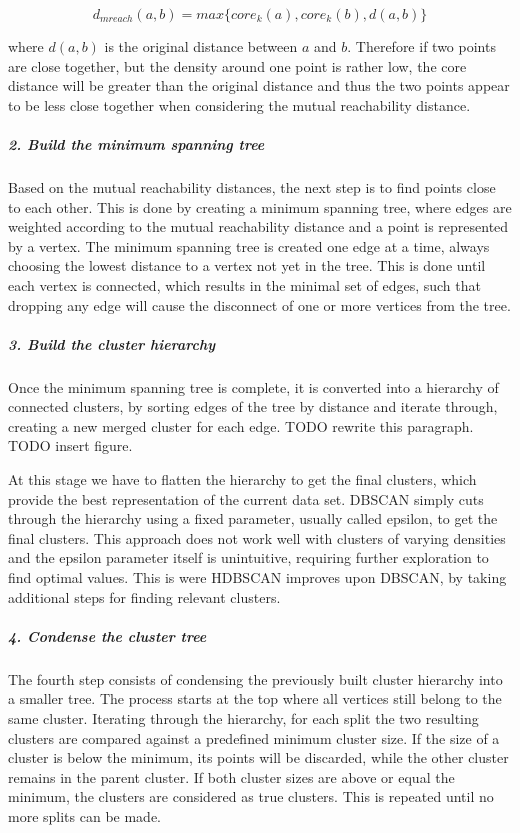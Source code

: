 \begin{equation*}
    d_{mreach}(a, b) = max\{core_k(a), core_k(b), d(a, b)\}
\end{equation*}

where $d(a, b)$ is the original distance between $a$ and $b$. Therefore if two points are close together, but the density around one point is rather low, the core distance will be greater than the original distance and thus the two points appear to be less close together when considering the mutual reachability distance.

\subparagraph{2. Build the minimum spanning tree}

Based on the mutual reachability distances, the next step is to find points close  to each other. This is done by creating a minimum spanning tree, where edges are weighted according to the mutual reachability distance and a point is represented by a vertex. The minimum spanning tree is created one edge at a time, always choosing the lowest distance to a vertex not yet in the tree. This is done until each vertex is connected, which results in the minimal set of edges, such that dropping any edge will cause the disconnect of one or more vertices from the tree.

\subparagraph{3. Build the cluster hierarchy}

Once the minimum spanning tree is complete, it is converted into a hierarchy of connected clusters, by sorting edges of the tree by distance and iterate through, creating a new merged cluster for each edge. TODO rewrite this paragraph. TODO insert figure.

At this stage we have to flatten the hierarchy to get the final clusters, which provide the best representation of the current data set. DBSCAN simply cuts through the hierarchy using a fixed parameter, usually called epsilon, to get the final clusters. This approach does not work well with clusters of varying densities and the epsilon parameter itself is unintuitive, requiring further exploration to find optimal values. This is were HDBSCAN improves upon DBSCAN, by taking additional steps for finding relevant clusters.

\subparagraph{4. Condense the cluster tree}

The fourth step consists of condensing the previously built cluster hierarchy into a smaller tree. The process starts at the top where all vertices still belong to the same cluster. Iterating through the hierarchy, for each split the two resulting clusters are compared against a predefined minimum cluster size. If the size of a cluster is below the minimum, its points will be discarded, while the other cluster remains in the parent cluster. If both cluster sizes are above or equal the minimum, the clusters are considered as true clusters. This is repeated until no more splits can be made.  

